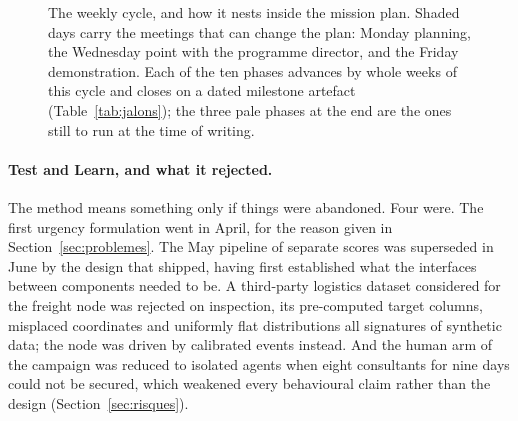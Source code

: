 \begin{figure}[H]
\caption[The weekly cycle and how it nests inside the mission plan]{The weekly cycle, and how
it nests inside the mission plan. Shaded days carry the meetings that can change the plan:
Monday planning, the Wednesday point with the programme director, and the Friday
demonstration. Each of the ten phases advances by whole weeks of this cycle and closes on a
dated milestone artefact (Table~\ref{tab:jalons}); the three pale phases at the end are the
ones still to run at the time of writing.}
\label{fig:semaine}
\end{figure}

\paragraph{Test and Learn, and what it rejected.}
The method means something only if things were abandoned. Four were. The first urgency
formulation went in April, for the reason given in Section~\ref{sec:problemes}. The May
pipeline of separate scores was superseded in June by the design that shipped, having first
established what the interfaces between components needed to be. A third-party logistics
dataset considered for the freight node was rejected on inspection, its pre-computed target
columns, misplaced coordinates and uniformly flat distributions all signatures of synthetic
data; the node was driven by calibrated events instead. And the human arm of the campaign was
reduced to isolated agents when eight consultants for nine days could not be secured, which
weakened every behavioural claim rather than the design (Section~\ref{sec:risques}).

